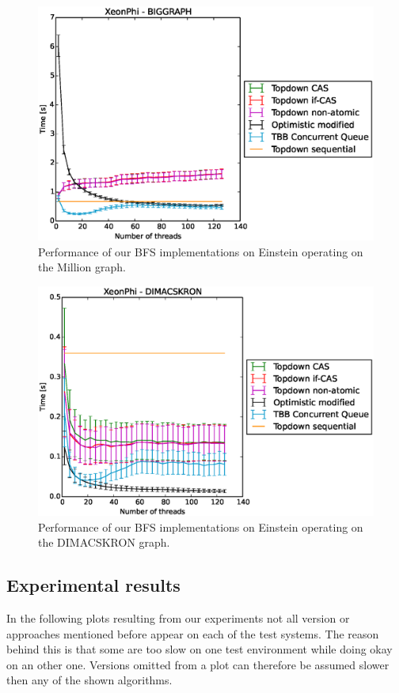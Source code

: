 \documentclass[letterpaper]{article}
\begin{document}
		\begin{figure}\centering
	  		\includegraphics[scale=0.33]{einstein_biggraph.eps}
	  		\caption{Performance of our BFS implementations on Einstein operating on the Million graph.\label{fig:einsteinbig}}
		\end{figure}
		\begin{figure}\centering
	  		\includegraphics[scale=0.33]{einstein_dimacskron.eps}
	  		\caption{Performance of our BFS implementations on Einstein operating on the DIMACSKRON graph.\label{fig:einsteinkron}}
		\end{figure}

	\subsection{Experimental results}
		In the following plots resulting from our experiments not all version or approaches mentioned before appear on each of the test systems. 
		The reason behind this is that some are too slow on one test environment while doing okay on an other one.
		Versions omitted from a plot can therefore be assumed slower then any of the shown algorithms.
		
\end{document}
